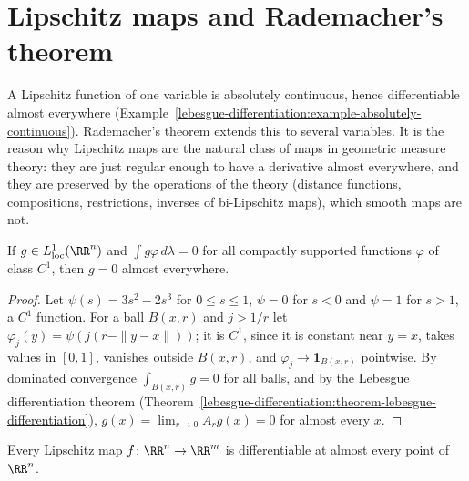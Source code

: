\section{Lipschitz maps and Rademacher's theorem}\label{geometric-measure-theory:section-rademacher}

A Lipschitz function of one variable is absolutely continuous, hence differentiable almost everywhere (Example~\ref{lebesgue-differentiation:example-absolutely-continuous}). Rademacher's theorem extends
this to several variables. It is the reason why Lipschitz maps are the natural class of maps in geometric measure theory: they are just regular enough to have a derivative almost everywhere,
and they are preserved by the operations of the theory (distance functions, compositions, restrictions, inverses of bi-Lipschitz maps), which smooth maps are not.

\begin{lemma}\label{geometric-measure-theory:lemma-vanishing-integrals}
If $g \in L^1_{\mathrm{loc}}(\RR^n)$ and $\int g\varphi\,d\lambda = 0$ for all compactly supported functions $\varphi$ of class $C^1$, then $g = 0$ almost everywhere.
\end{lemma}

\begin{proof}
Let $\psi(s) = 3s^2 - 2s^3$ for $0 \leq s \leq 1$, $\psi = 0$ for $s < 0$ and $\psi = 1$ for $s > 1$, a $C^1$ function. For a ball $B(x, r)$ and $j > 1/r$ let
$\varphi_j(y) = \psi(j(r - \|y - x\|))$; it is $C^1$, since it is constant near $y = x$, takes values in $[0, 1]$, vanishes outside $B(x, r)$, and $\varphi_j \to \mathbf{1}_{B(x, r)}$
pointwise. By dominated convergence $\int_{B(x, r)}g = 0$ for all balls, and by the Lebesgue differentiation theorem (Theorem~\ref{lebesgue-differentiation:theorem-lebesgue-differentiation}),
$g(x) = \lim_{r \to 0}A_rg(x) = 0$ for almost every $x$.
\end{proof}

\begin{theorem}[Rademacher]\label{geometric-measure-theory:theorem-rademacher}
Every Lipschitz map $f \colon \RR^n \to \RR^m$ is differentiable at almost every point of $\RR^n$.
\end{theorem}

